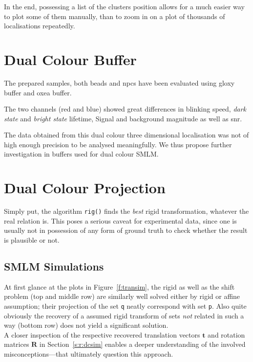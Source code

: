 \documentclass[11pt, a4paper, oneside, twocolumn]{report}
\renewcommand{\b}{\textbf}
\renewcommand{\tt}{\texttt}
\newcommand{\e}{\emph}
\begin{document}
In the end, possessing a list of the clusters position allows for a
much easier way to plot some of them manually, than to zoom in on a
plot of thousands of localisations repeatedly.


\section{Dual Colour Buffer}

The prepared samples, both beads and \gls{npc}s have been evaluated
using \gls{gloxy} buffer and \gls{oxea} buffer.

The two channels (red and blue) showed great differences in blinking
speed, \e{dark state} and \e{bright state} lifetime, Signal and
background magnitude as well as \gls{snr}.

The data obtained from this dual colour three dimensional localisation
was not of high enough precision to be analysed meaningfully. We thus
propose further investigation in buffers used for dual colour SMLM.
  

\section{Dual Colour Projection}

Simply put, the algorithm \tt{rig()} finds the \e{best} rigid
transformation, whatever the real relation is. This poses a serious
caveat for experimental data, since one is usually not in possession
of any form of ground truth to check whether the result is plausible
or not.

\subsection{SMLM Simulations}\label{d:dcsim}

At first glance at the plots in Figure~\ref{f:transim}, the rigid as
well as the shift problem (top and middle row) are similarly well
solved either by rigid or affine assumption; their projection of the
set \tt{q} neatly correspond with set \tt{p}. Also quite obviously the
recovery of a assumed rigid transform of sets \e{not} related in such
a way (bottom row) does not yield a significant solution.\\

A closer inspection of the respective recovered translation vectors
$\b{t}$ and rotation matrices $\b{R}$ in Section~\ref{s:r:dcsim}
enables a deeper understanding of the involved misconceptions---that
ultimately question this approach.
\end{document}
